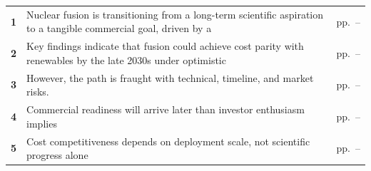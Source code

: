 \documentclass[10pt,a4paper]{article}
\begin{document}
\begin{tabularx}{\linewidth}{p{8mm}Yp{29mm}}
\textcolor{BOBlue}{\bfseries 1} & Nuclear fusion is transitioning from a long-term scientific aspiration to a tangible commercial goal, driven by a & {\color{BOMuted}pp.~\pageref{chap:1}--\pageref{chap:1:end}} \\[3pt]
\textcolor{BOBlue}{\bfseries 2} & Key findings indicate that fusion could achieve cost parity with renewables by the late 2030s under optimistic & {\color{BOMuted}pp.~\pageref{chap:2}--\pageref{chap:2:end}} \\[3pt]
\textcolor{BOBlue}{\bfseries 3} & However, the path is fraught with technical, timeline, and market risks. & {\color{BOMuted}pp.~\pageref{chap:3}--\pageref{chap:3:end}} \\[3pt]
\textcolor{BOBlue}{\bfseries 4} & Commercial readiness will arrive later than investor enthusiasm implies & {\color{BOMuted}pp.~\pageref{chap:4}--\pageref{chap:4:end}} \\[3pt]
\textcolor{BOBlue}{\bfseries 5} & Cost competitiveness depends on deployment scale, not scientific progress alone & {\color{BOMuted}pp.~\pageref{chap:5}--\pageref{chap:5:end}} \\[3pt]
\end{tabularx}
\clearpage
\end{document}
